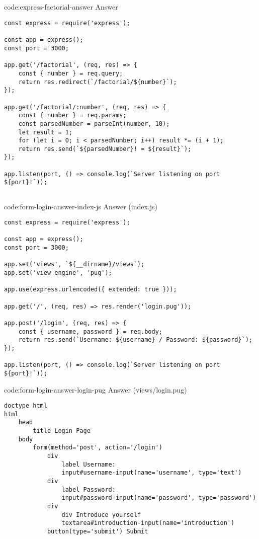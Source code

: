 \subsection*{}

\begin{codeenv}{code:express-factorial-answer}{ Answer}\begin{verbatim}
const express = require('express');

const app = express();
const port = 3000;

app.get('/factorial', (req, res) => {
    const { number } = req.query;
    return res.redirect(`/factorial/${number}`);
});

app.get('/factorial/:number', (req, res) => {
    const { number } = req.params;
    const parsedNumber = parseInt(number, 10);
    let result = 1;
    for (let i = 0; i < parsedNumber; i++) result *= (i + 1);
    return res.send(`${parsedNumber}! = ${result}`);
});

app.listen(port, () => console.log(`Server listening on port ${port}!`));
\end{verbatim}
\end{codeenv}

\subsection*{}

\begin{codeenv}{code:form-login-answer-index-js}{ Answer (index.js)}\begin{verbatim}
const express = require('express');

const app = express();
const port = 3000;

app.set('views', `${__dirname}/views`);
app.set('view engine', 'pug');

app.use(express.urlencoded({ extended: true }));

app.get('/', (req, res) => res.render('login.pug'));

app.post('/login', (req, res) => {
    const { username, password } = req.body;
    return res.send(`Username: ${username} / Password: ${password}`);
});

app.listen(port, () => console.log(`Server listening on port ${port}!`));
\end{verbatim}
\end{codeenv}

\begin{codeenv}{code:form-login-answer-login-pug}{ Answer (views/login.pug)}\begin{verbatim}
doctype html
html
    head
        title Login Page
    body
        form(method='post', action='/login')
            div
                label Username:
                input#username-input(name='username', type='text')
            div
                label Password:
                input#password-input(name='password', type='password')
            div
                div Introduce yourself
                textarea#introduction-input(name='introduction')
            button(type='submit') Submit
\end{verbatim}
\end{codeenv}
